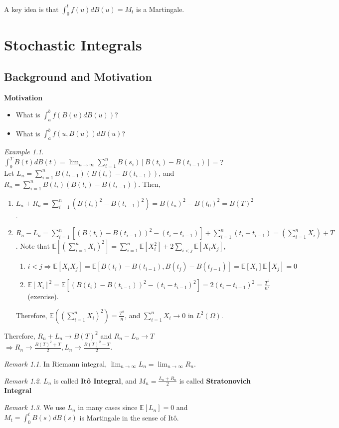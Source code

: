 \documentclass[12pt]{report}
\newcommand{\E}{\mathbb{E}}
\renewcommand{\1}{\mathbb{1}}
\renewcommand{\O}{\Omega}
\theoremstyle{break}
\theoremstyle{newdef}
\theoremstyle{remark}
\newtheorem*{exmp}{Example} %
\newtheorem*{rem}{Remark} %
\begin{document}
A key idea is that $\int_0^t f(u) dB(u) = M_t$ is a Martingale.



\setcounter{chapter}{3}
\chapter{Stochastic Integrals}
\section{Background and Motivation}

\textbf{Motivation}
\begin{itemize}
\item What is $\int_a^b f(B(u)dB(u))$?
\item What is $\int_a^b f(u,B(u))dB(u)$?
\end{itemize}

\begin{exmp}
$\int_0^T B(t)dB(t) = \lim_{n\rightarrow\infty} \sum_{i=1}^n B(s_i) \left[B(t_i) - B(t_{i-1})\right] = $?\\
Let $L_n = \sum_{i=1}^n B(t_{i-1})(B(t_{i}) - B(t_{i-1}))$, and
$R_n = \sum_{i=1}^n B(t_i) (B(t_i) - B(t_{i-1}))$.
Then,
\begin{enumerate}%
\item $L_n + R_n = \sum_{i=1}^n (B(t_i)^2 - B(t_{i-1})^2) = B(t_n)^2 - B(t_0)^2 = B(T)^2$.
\item $R_n - L_n = \sum_{i=1}^n [(B(t_i) - B(t_{i-1}))^2 - (t_i-t_{i-1})] + \sum_{i=1}^n (t_i - t_{i-1}) = (\sum_{i=1}^n X_i) + T$.
Note that $\E[(\sum_{i=1}^n X_i)^2] = \sum_{i=1}^n \E[X_i^2] + 2\sum_{i<j} \E[X_iX_j]$,
\begin{enumerate}[wide]
\item
$i < j \Rightarrow \E[X_iX_j] = \E[B(t_i)-B(t_{i-1}), B(t_j) - B(t_{j-1}) ] = \E[X_i]\E[X_j] = 0$

\item
$\E[X_i]^2 = \E\left[ (B(t_i)-B(t_{i-1}))^2 - (t_i - t_{i-1})^2 \right] = 2(t_i-t_{i-1})^2 = \frac{T^2}{n^2}$ (exercise).
\end{enumerate}
Therefore, $\E((\sum_{i=1}^n X_i)^2) = \frac{T^2}{n}$, and
$\sum_{i=1}^n X_i \rightarrow 0$ in $L^2(\O) .$%
\end{enumerate}
Therefore, $R_n + L_n \rightarrow B(T)^2$ and $R_n - L_n \rightarrow T$\\
$\Rightarrow R_n \rightarrow \frac{B(T)^2 + T}{2}, L_n \rightarrow \frac{B(T)^2 - T}{2}$.

\begin{rem}
In Riemann integral, $\lim_{n\rightarrow\infty} L_n = \lim_{n\rightarrow\infty} R_n$.
\end{rem}

\begin{rem}
$L_n$ is called \textbf{It\^o Integral}, and
$M_n = \frac{L_n + R_n}{2}$ is called \textbf{Stratonovich Integral}
\end{rem}
\begin{rem}
We use $L_n$ in many cases since $\E[L_n] = 0$ and $M_t = \int_0^t B(s) dB(s)$ is Martingale in the sense of It\^o.
\end{rem}
\end{exmp}
\end{document}
